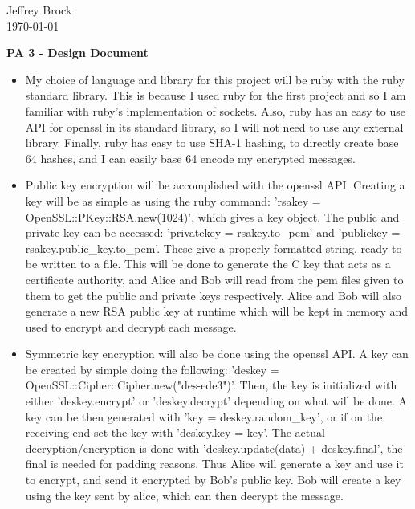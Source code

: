 \documentclass[letterpaper,12pt]{article}
\begin{document}
\begin{flushleft}
Jeffrey Brock\\
{\today}\\
\end{flushleft}
\begin{center}
\large\textbf{PA 3 - Design Document}
\end{center}
\begin{itemize}

    \item My choice of language and library for this project will be ruby with the ruby standard library. This is because I used ruby for the first project and so I am familiar with ruby's implementation of sockets. Also, ruby has an easy to use API for openssl in its standard library, so I will not need to use any external library. Finally, ruby has easy to use SHA-1 hashing, to directly create base 64 hashes, and I can easily base 64 encode my encrypted messages.

    \item Public key encryption will be accomplished with the openssl API. Creating a key will be as simple as using the ruby command: 'rsakey = OpenSSL::PKey::RSA.new(1024)', which gives a key object. The public and private key can be accessed: 'privatekey = rsakey.to\_pem' and 'publickey = rsakey.public\_key.to\_pem'. These give a properly formatted string, ready to be written to a file. This will be done to generate the C key that acts as a certificate authority, and Alice and Bob will read from the pem files given to them to get the public and private keys respectively. Alice and Bob will also generate a new RSA public key at runtime which will be kept in memory and used to encrypt and decrypt each message.
    
    \item Symmetric key encryption will also be done using the openssl API. A key can be created by simple doing the following: 'deskey = OpenSSL::Cipher::Cipher.new("des-ede3")'. Then, the key is initialized with either 'deskey.encrypt' or 'deskey.decrypt' depending on what will be done. A key can be then generated with 'key = deskey.random\_key', or if on the receiving end set the key with 'deskey.key = key'. The actual decryption/encryption is done with 'deskey.update(data) + deskey.final', the final is needed for padding reasons. Thus Alice will generate a key and use it to encrypt, and send it encrypted by Bob's public key. Bob will create a key using the key sent by alice, which can then decrypt the message.


\end{itemize}
\end{document}
